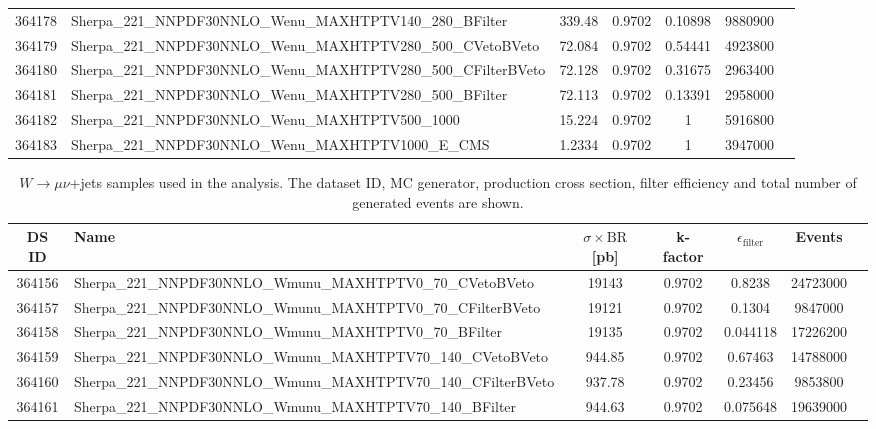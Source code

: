 \begin{landscape}
\begin{table}[p]
\begin{footnotesize}
\begin{center}
\begin{tabular}{|c|l|c|c|c|c|r|}
					364178 & Sherpa\_221\_NNPDF30NNLO\_Wenu\_MAXHTPTV140\_280\_BFilter & 339.48 & 0.9702 & 0.10898 & 9880900 \\
					364179 & Sherpa\_221\_NNPDF30NNLO\_Wenu\_MAXHTPTV280\_500\_CVetoBVeto & 72.084 & 0.9702 & 0.54441 & 4923800 \\
					364180 & Sherpa\_221\_NNPDF30NNLO\_Wenu\_MAXHTPTV280\_500\_CFilterBVeto & 72.128 & 0.9702 & 0.31675 & 2963400 \\
					364181 & Sherpa\_221\_NNPDF30NNLO\_Wenu\_MAXHTPTV280\_500\_BFilter & 72.113 & 0.9702 & 0.13391 & 2958000 \\
					364182 & Sherpa\_221\_NNPDF30NNLO\_Wenu\_MAXHTPTV500\_1000 & 15.224 & 0.9702 & 1 & 5916800 \\
					364183 & Sherpa\_221\_NNPDF30NNLO\_Wenu\_MAXHTPTV1000\_E\_CMS & 1.2334 & 0.9702 & 1 & 3947000 \\
					\hline
				\end{tabular}
			\end{center}
		\end{footnotesize}
	\end{table}
\begin{table}[!htb]
	\caption{$W \to \mu\nu$+jets samples used in the analysis. The dataset ID, MC generator, production cross section, filter efficiency and total number of generated events are shown.}
	\label{tabular:mc_samples_Wmunujets}
	\begin{footnotesize}
		\begin{center}
			\begin{tabular}{|c|l|c|c|c|c|r|}
				\hline
				DS ID & Name & $\sigma\times\text{BR}$ [pb] & k-factor & $\epsilon_{\text{filter}}$ & Events \\ \hline
				364156 & Sherpa\_221\_NNPDF30NNLO\_Wmunu\_MAXHTPTV0\_70\_CVetoBVeto & 19143 & 0.9702 & 0.8238 & 24723000 \\
				364157 & Sherpa\_221\_NNPDF30NNLO\_Wmunu\_MAXHTPTV0\_70\_CFilterBVeto & 19121 & 0.9702 & 0.1304 & 9847000 \\
				364158 & Sherpa\_221\_NNPDF30NNLO\_Wmunu\_MAXHTPTV0\_70\_BFilter & 19135 & 0.9702 & 0.044118 & 17226200 \\
				364159 & Sherpa\_221\_NNPDF30NNLO\_Wmunu\_MAXHTPTV70\_140\_CVetoBVeto & 944.85 & 0.9702 & 0.67463 & 14788000 \\
				364160 & Sherpa\_221\_NNPDF30NNLO\_Wmunu\_MAXHTPTV70\_140\_CFilterBVeto & 937.78 & 0.9702 & 0.23456 & 9853800 \\
				364161 & Sherpa\_221\_NNPDF30NNLO\_Wmunu\_MAXHTPTV70\_140\_BFilter & 944.63 & 0.9702 & 0.075648 & 19639000 \\

\end{tabular}
\end{center}
\end{footnotesize}
\end{table}
\end{landscape}
